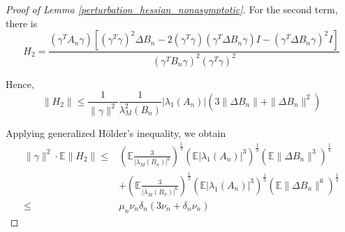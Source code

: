 \documentclass{article} \usepackage{iclr2019_conference,times}
\newcommand{\expe}{\mathbb{E}}
\begin{document}
\begin{proof}[Proof of Lemma \ref{perturbation_hessian_nonasymptotic}]
For the second term, there is 
\begin{equation}
    H_2 = \frac{(\gamma^T A_n \gamma)[(\gamma^T \gamma)^2 \Delta B_n - 2 (\gamma^T \gamma) (\gamma^T \Delta B_n \gamma) I - (\gamma^T \Delta B_n \gamma)^2 I]}{(\gamma^T B_n \gamma)^2 (\gamma^T \gamma)^2}
\end{equation}

Hence, 
\begin{equation}
    \| H_2 \| \leq \frac{1}{\| \gamma \|^2} \frac{1}{\lambda_M^2 (B_n)} |\lambda_1(A_n)| (3 \| \Delta B_n \| + \| \Delta B_n \|^2)
\end{equation}

Applying generalized H{\"o}lder's inequality, we obtain
\begin{equation}
    \begin{split}
        \|\gamma\|^2 \cdot \expe \| H_2\| \leq &  \left(\expe \frac{3}{|\lambda_M(B_n)|^6}\right)^\frac{1}{3} (\expe |\lambda_1(A_n)|^3)^\frac{1}{3} (\expe \| \Delta B_n \|^3)^\frac{1}{3} \\
        & + \left(\expe \frac{3}{|\lambda_M(B_n)|^6}\right)^\frac{1}{3} (\expe |\lambda_1(A_n)|^3)^\frac{1}{3} (\expe \| \Delta B_n \|^6)^\frac{1}{3} \\
        \leq & \mu_n \nu_n \delta_n (3 \nu_n + \delta_n \nu_n)
    \end{split}
\end{equation}


\end{proof}
\end{document}
